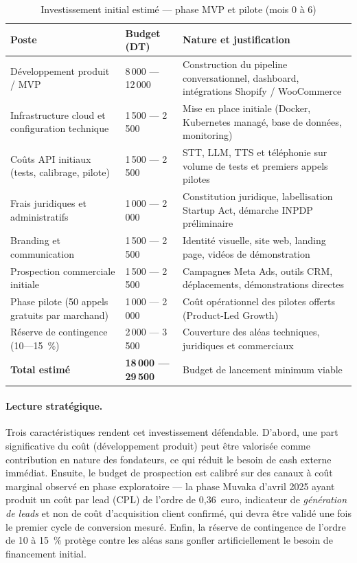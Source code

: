 \begin{table}[H]
\centering
\caption{Investissement initial estimé — phase MVP et pilote (mois 0 à 6)}
\label{tab:investissement_initial}
\begin{tabular}{|p{5cm}|p{3cm}|p{6cm}|}
\hline
\textbf{Poste} & \textbf{Budget (DT)} & \textbf{Nature et justification} \\
\hline
Développement produit / MVP & 8\,000 — 12\,000 & Construction du pipeline conversationnel, dashboard, intégrations Shopify / WooCommerce \\
\hline
Infrastructure cloud et configuration technique & 1\,500 — 2\,500 & Mise en place initiale (Docker, Kubernetes managé, base de données, monitoring) \\
\hline
Coûts API initiaux (tests, calibrage, pilote) & 1\,500 — 2\,500 & STT, LLM, TTS et téléphonie sur volume de tests et premiers appels pilotes \\
\hline
Frais juridiques et administratifs & 1\,000 — 2\,000 & Constitution juridique, labellisation Startup Act, démarche INPDP préliminaire \\
\hline
Branding et communication & 1\,500 — 2\,500 & Identité visuelle, site web, landing page, vidéos de démonstration \\
\hline
Prospection commerciale initiale & 1\,500 — 2\,500 & Campagnes Meta Ads, outils CRM, déplacements, démonstrations directes \\
\hline
Phase pilote (50 appels gratuits par marchand) & 1\,000 — 2\,000 & Coût opérationnel des pilotes offerts (Product-Led Growth) \\
\hline
Réserve de contingence (10—15~\%) & 2\,000 — 3\,500 & Couverture des aléas techniques, juridiques et commerciaux \\
\hline
\textbf{Total estimé} & \textbf{18\,000 — 29\,500} & Budget de lancement minimum viable \\
\hline
\end{tabular}
\end{table}

\paragraph{Lecture stratégique.} Trois caractéristiques rendent cet investissement défendable. D'abord, une part significative du coût (développement produit) peut être valorisée comme contribution en nature des fondateurs, ce qui réduit le besoin de cash externe immédiat. Ensuite, le budget de prospection est calibré sur des canaux à coût marginal observé en phase exploratoire — la phase Muvaka d'avril 2025 ayant produit un coût par lead (CPL) de l'ordre de 0{,}36~euro, indicateur de \emph{génération de leads} et non de coût d'acquisition client confirmé, qui devra être validé une fois le premier cycle de conversion mesuré. Enfin, la réserve de contingence de l'ordre de 10 à 15~\% protège contre les aléas sans gonfler artificiellement le besoin de financement initial.

